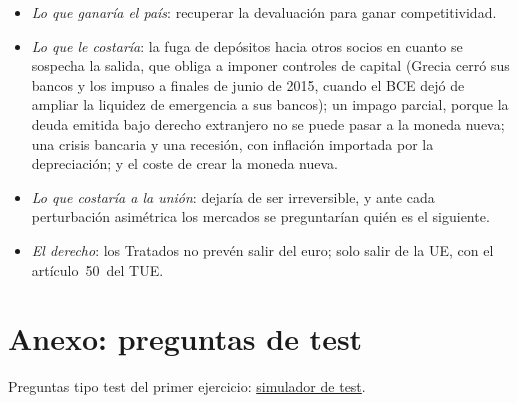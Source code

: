 \documentclass[11pt]{article}
\begin{document}
\begin{itemize}
\begin{itemize}
  \item \emph{Lo que ganaría el país}: recuperar la devaluación para ganar competitividad.
  \item \emph{Lo que le costaría}: la fuga de depósitos hacia otros socios en cuanto se sospecha la salida, que obliga a imponer controles de capital (Grecia cerró sus bancos y los impuso a finales de junio de 2015, cuando el BCE dejó de ampliar la liquidez de emergencia a sus bancos\nocite{BCE2015ELA}); un impago parcial, porque la deuda emitida bajo derecho extranjero no se puede pasar a la moneda nueva; una crisis bancaria y una recesión, con inflación importada por la depreciación; y el coste de crear la moneda nueva.
  \item \emph{Lo que costaría a la unión}: dejaría de ser irreversible, y ante cada perturbación asimétrica los mercados se preguntarían quién es el siguiente.
  \item \emph{El derecho}: los Tratados no prevén salir del euro; solo salir de la UE, con el artículo~50~del TUE\nocite{TUE2016}.
  \end{itemize}
\end{itemize}

\section{Anexo: preguntas de test}\label{anexo:test}

\begin{anotaciones}
Preguntas tipo test del primer ejercicio: \href{https://www.victorgutierrezmarcos.es/oposicion/temario/primer-ejercicio/test/simulador.html?tema=3.B.16}{simulador de test}.
\end{anotaciones}


\bibliografia
\end{document}
